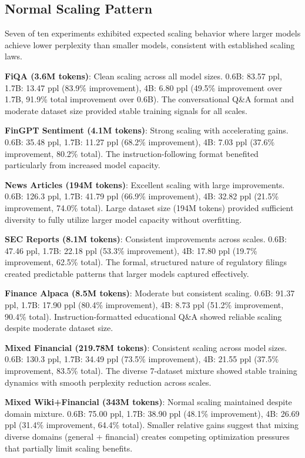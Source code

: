 \subsection{Normal Scaling Pattern}

Seven of ten experiments exhibited expected scaling behavior where larger models achieve lower perplexity than smaller models, consistent with established scaling laws.

\textbf{FiQA (3.6M tokens)}: Clean scaling across all model sizes. 0.6B: 83.57 ppl, 1.7B: 13.47 ppl (83.9\% improvement), 4B: 6.80 ppl (49.5\% improvement over 1.7B, 91.9\% total improvement over 0.6B). The conversational Q\&A format and moderate dataset size provided stable training signals for all scales.

\textbf{FinGPT Sentiment (4.1M tokens)}: Strong scaling with accelerating gains. 0.6B: 35.48 ppl, 1.7B: 11.27 ppl (68.2\% improvement), 4B: 7.03 ppl (37.6\% improvement, 80.2\% total). The instruction-following format benefited particularly from increased model capacity.

\textbf{News Articles (194M tokens)}: Excellent scaling with large improvements. 0.6B: 126.3 ppl, 1.7B: 41.79 ppl (66.9\% improvement), 4B: 32.82 ppl (21.5\% improvement, 74.0\% total). Large dataset size (194M tokens) provided sufficient diversity to fully utilize larger model capacity without overfitting.

\textbf{SEC Reports (8.1M tokens)}: Consistent improvements across scales. 0.6B: 47.46 ppl, 1.7B: 22.18 ppl (53.3\% improvement), 4B: 17.80 ppl (19.7\% improvement, 62.5\% total). The formal, structured nature of regulatory filings created predictable patterns that larger models captured effectively.

\textbf{Finance Alpaca (8.5M tokens)}: Moderate but consistent scaling. 0.6B: 91.37 ppl, 1.7B: 17.90 ppl (80.4\% improvement), 4B: 8.73 ppl (51.2\% improvement, 90.4\% total). Instruction-formatted educational Q\&A showed reliable scaling despite moderate dataset size.

\textbf{Mixed Financial (219.78M tokens)}: Consistent scaling across model sizes. 0.6B: 130.3 ppl, 1.7B: 34.49 ppl (73.5\% improvement), 4B: 21.55 ppl (37.5\% improvement, 83.5\% total). The diverse 7-dataset mixture showed stable training dynamics with smooth perplexity reduction across scales.

\textbf{Mixed Wiki+Financial (343M tokens)}: Normal scaling maintained despite domain mixture. 0.6B: 75.00 ppl, 1.7B: 38.90 ppl (48.1\% improvement), 4B: 26.69 ppl (31.4\% improvement, 64.4\% total). Smaller relative gains suggest that mixing diverse domains (general + financial) creates competing optimization pressures that partially limit scaling benefits.

